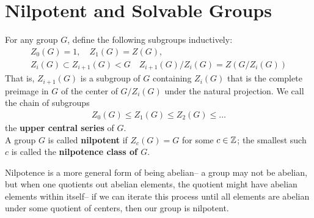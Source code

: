 \documentclass{memoir}
\begin{document}


\section{Nilpotent and Solvable Groups}
\label{sec:nilpotent_and_solvable_groups}

\begin{defn}[Nilpotence]
	For any group \(G\), define the following subgroups inductively:
	\begin{align*}
		Z_0(G) = 1, \quad Z_1(G) = Z(G),\\
		Z_i(G) \subset Z_{i+1}(G) < G \quad Z_{i+1}(G) / Z_i(G) = Z(G / Z_i(G))
	\end{align*}
	That is, \(Z_{i+1}(G)\) is a subgroup of \(G\) containing \(Z_i(G)\) that is the complete preimage in \(G\) of the center of \(G / Z_i(G)\) under the natural projection. We call the chain of subgroups
	\begin{align*}
		Z_0(G) \leq Z_1(G) \leq Z_2(G) \leq \ldots
	\end{align*}
	the \textbf{upper central series} of \(G\).\\

	A group \(G\) is called \textbf{nilpotent} if \(Z_c(G) = G\) for some \(c \in \mathbb{Z}\); the smallest such \(c\) is called the \textbf{nilpotence class of \(G\)}.
\end{defn}
Nilpotence is a more general form of being abelian-- a group may not be abelian, but when one quotients out abelian elements, the quotient might have abelian elements within itself-- if we can iterate this process until all elements are abelian under some quotient of centers, then our group is nilpotent.
\end{document}
